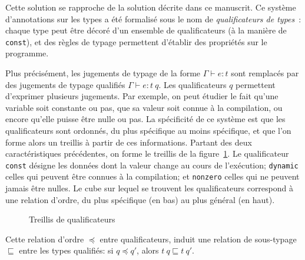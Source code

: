 Cette solution se rapproche de la solution décrite dans ce manuscrit. Ce système
d'annotations sur les types a été formalisé sous le nom de \emph{qualificateurs
de types}~\cite{toplas-quals}: chaque type peut être décoré d'un ensemble de
qualificateurs (à la manière de \texttt{const}), et des règles de typage
permettent d'établir des propriétés sur le programme.

Plus précisément, les jugements de typage de la forme $Γ ⊢ e : t$ sont remplacés
par des jugements de typage qualifiés $Γ ⊢ e : t~q$. Les qualificateurs $q$
permettent d'exprimer plusieurs jugements. Par exemple, on peut
étudier le fait qu'une variable soit constante ou pas, que sa valeur soit connue
à la compilation, ou encore qu'elle puisse être nulle ou pas. La spécificité de
ce système est que les qualificateurs sont ordonnés, du plus spécifique au moins
spécifique, et que l'on forme alors un treillis à partir de ces informations.
Partant des deux caractéristiques précédentes, on forme le treillis de la
figure~\ref{fig:cqual-treillis}. Le qualificateur \texttt{const} désigne les
données dont la valeur change au cours de l'exécution; \texttt{dynamic} celles
qui peuvent être connues à la compilation; et \texttt{nonzero} celles qui ne
peuvent jamais être nulles. Le cube sur lequel se trouvent les qualificateurs
correspond à une relation d'ordre, du plus spécifique (en bas) au plus général
(en haut).

\begin{figure}
\centering
{}

\caption{Treillis de qualificateurs}
\label{fig:cqual-treillis}
\end{figure}

Cette relation d'ordre $\preceq$ entre qualificateurs, induit une relation de
sous-typage $\sqsubseteq$ entre les types qualifiés: si $q \preceq q'$, alors
$t~q \sqsubseteq t~q'$.


